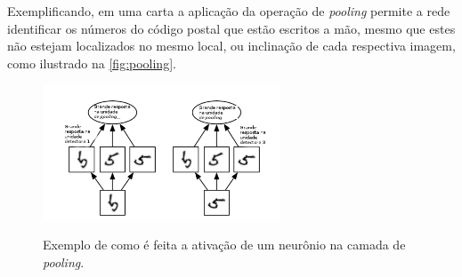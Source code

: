 \par Exemplificando, em uma carta a aplicação da operação de \textit{pooling} permite a rede identificar os números do código postal que estão escritos a mão, mesmo que estes não estejam localizados no mesmo local, ou inclinação de cada respectiva imagem, como ilustrado na \autoref{fig:pooling}. 
\begin{figure}[H]
  \centering
  \caption{Exemplo de como é feita a ativação de um neurônio na camada de \textit{pooling}.}
  \includegraphics[width=200pt]{dados/figuras/pooling}
  \label{fig:pooling}
\end{figure}


